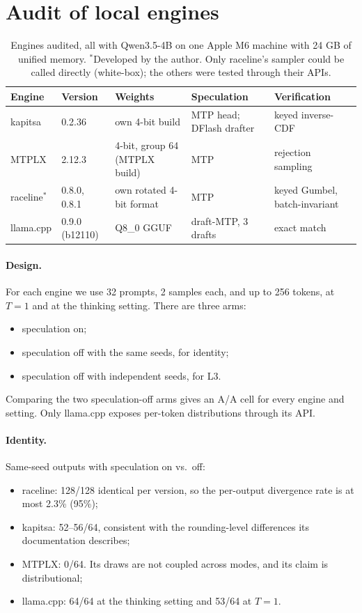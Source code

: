 \documentclass[10pt]{article}
\theoremstyle{remark}
\begin{document}
\section{Audit of local engines}\label{sec:audit}
\begin{table}[h]\centering\small
\begin{tabular}{lllll}
\toprule
Engine & Version & Weights & Speculation & Verification \\
\midrule
kapitsa & 0.2.36 & own 4-bit build & MTP head; DFlash drafter & keyed inverse-CDF \\
MTPLX & 2.12.3 & 4-bit, group 64 (MTPLX build) & MTP & rejection sampling \\
raceline$^*$ & 0.8.0, 0.8.1 & own rotated 4-bit format & MTP & keyed Gumbel, batch-invariant \\
llama.cpp & 0.9.0 (b12110) & Q8\_0 GGUF & draft-MTP, 3 drafts & exact match \\
\bottomrule
\end{tabular}
\caption{Engines audited, all with Qwen3.5-4B on one Apple M6 machine with 24 GB of unified memory. $^*$Developed by the author. Only raceline's sampler could be called directly (white-box); the others were tested through their APIs.}\label{tab:engines}\end{table}

\paragraph{Design.} For each engine we use 32 prompts, 2 samples each, and up to 256 tokens, at $T{=}1$ and at the thinking setting. There are three arms:
\begin{itemize}
\item speculation on;
\item speculation off with the same seeds, for identity;
\item speculation off with independent seeds, for L3.
\end{itemize}
Comparing the two speculation-off arms gives an A/A cell for every engine and setting. Only llama.cpp exposes per-token distributions through its API.

\paragraph{Identity.} Same-seed outputs with speculation on vs.\ off:
\begin{itemize}
\item raceline: 128/128 identical per version, so the per-output divergence rate is at most 2.3\% (95\%);
\item kapitsa: 52--56/64, consistent with the rounding-level differences its documentation describes;
\item MTPLX: 0/64. Its draws are not coupled across modes, and its claim is distributional;
\item llama.cpp: 64/64 at the thinking setting and 53/64 at $T{=}1$.
\end{itemize}
\end{document}
